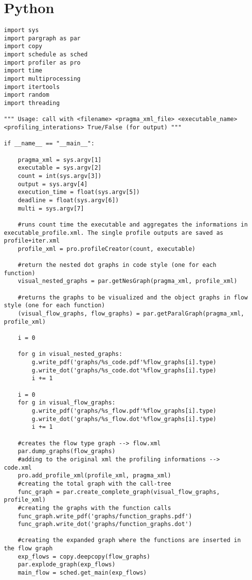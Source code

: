 \documentclass[a4paper,10pt,twoside]{book}
\begin{document}
\chapter{Python}

\begin{lstlisting}[language=CCC, caption=graphCreator.py]
import sys
import pargraph as par
import copy
import schedule as sched
import profiler as pro
import time
import multiprocessing
import itertools
import random
import threading

""" Usage: call with <filename> <pragma_xml_file> <executable_name> <profiling_interations> True/False (for output) """

if __name__ == "__main__":

	pragma_xml = sys.argv[1]
	executable = sys.argv[2]
	count = int(sys.argv[3])
	output = sys.argv[4]
	execution_time = float(sys.argv[5])
	deadline = float(sys.argv[6])
	multi = sys.argv[7]

	#runs count time the executable and aggregates the informations in executable_profile.xml. The single profile outputs are saved as profile+iter.xml
	profile_xml = pro.profileCreator(count, executable)

	#return the nested dot graphs in code style (one for each function)
	visual_nested_graphs = par.getNesGraph(pragma_xml, profile_xml)

	#returns the graphs to be visualized and the object graphs in flow style (one for each function)
	(visual_flow_graphs, flow_graphs) = par.getParalGraph(pragma_xml, profile_xml) 

	i = 0

	for g in visual_nested_graphs:
		g.write_pdf('graphs/%s_code.pdf'%flow_graphs[i].type)
		g.write_dot('graphs/%s_code.dot'%flow_graphs[i].type)
		i += 1

	i = 0
	for g in visual_flow_graphs:
		g.write_pdf('graphs/%s_flow.pdf'%flow_graphs[i].type)
		g.write_dot('graphs/%s_flow.dot'%flow_graphs[i].type)
		i += 1

	#creates the flow type graph --> flow.xml
	par.dump_graphs(flow_graphs)
	#adding to the original xml the profiling informations --> code.xml
	pro.add_profile_xml(profile_xml, pragma_xml)
	#creating the total graph with the call-tree
	func_graph = par.create_complete_graph(visual_flow_graphs, profile_xml)
	#creating the graphs with the function calls
	func_graph.write_pdf('graphs/function_graphs.pdf')
	func_graph.write_dot('graphs/function_graphs.dot')

	#creating the expanded graph where the functions are inserted in the flow graph
	exp_flows = copy.deepcopy(flow_graphs)
	par.explode_graph(exp_flows)
	main_flow = sched.get_main(exp_flows)


\end{lstlisting}
\end{document}
